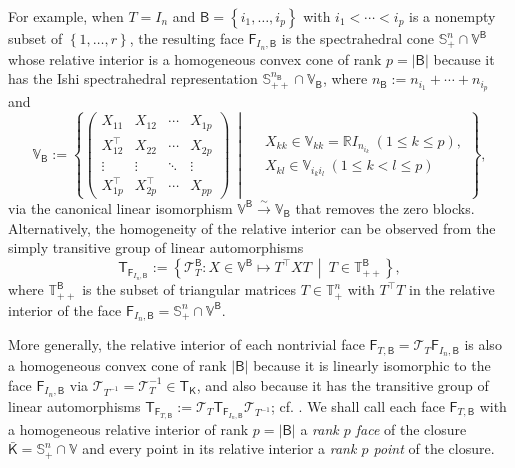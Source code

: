 \documentclass[oneside]{amsart}
\theoremstyle{plain}
\theoremstyle{definition}
\theoremstyle{remark}
\numberwithin{equation}{section}
\begin{document}
For example, when $T =  I_{n}$ and $\mathsf{B} = \left\{i_{1}, \dotsc,
i_{p}\right\}$ with $i_{1} < \dotsb < i_{p}$ is a nonempty subset of
$\left\{1, \dotsc, r\right\}$, the resulting face
$\mathsf{F}_{I_{n},\mathsf{B}}$ is the spectrahedral cone
$\mathbb{S}^{n}_{+} \cap \mathbb{V}^{\mathsf{B}}$ whose relative interior
is a homogeneous convex cone of rank $p = \lvert \mathsf{B} \rvert$ because
it has the Ishi spectrahedral representation
$\mathbb{S}^{n_{\mathsf{B}}}_{++} \cap \mathbb{V}_{\mathsf{B}}$, where
$n_{\mathsf{B}} := n_{i_{1}} + \dotsb + n_{i_{p}}$ and
\[
\mathbb{V}_{\mathsf{B}} := \left\{
\begin{pmatrix}
X_{11} & X_{12} & \cdots & X_{1p}
\\
X_{12}^{\top} & X_{22} & \cdots & X_{2p}
\\
\vdots & \vdots & \ddots & \vdots
\\
X_{1p}^{\top} & X_{2p}^{\top} & \cdots & X_{pp}
\end{pmatrix}
\ \middle|\
\begin{aligned}
& X_{kk} \in \mathbb{V}_{kk} = \mathbb{R} I_{n_{i_{k}}} \ (1 \leq k \leq
p),
\\
& X_{kl} \in \mathbb{V}_{i_{k} i_{l}} \ (1 \leq k < l \leq p)
\end{aligned}
\right\},
\]
via the canonical linear isomorphism $\mathbb{V}^{\mathsf{B}}
\xrightarrow{\sim} \mathbb{V}_{\mathsf{B}}$ that removes the zero blocks.
Alternatively, the homogeneity of the relative interior can be observed
from the simply transitive group of linear automorphisms
\[
\mathsf{T}_{\mathsf{F}_{I_{n},\mathsf{B}}} :=
\left\{\mathcal{T}_{T}^{\mathsf{B}} : X \in \mathbb{V}^{\mathsf{B}} \mapsto
T^{\top} X T\ \middle|\ T \in \mathbb{T}_{++}^{\mathsf{B}}\right\},
\]
where $\mathbb{T}_{++}^{\mathsf{B}}$ is the subset of triangular matrices
$T \in \mathbb{T}^{n}_{+}$ with $T^{\top} T$ in the relative interior of
the face $\mathsf{F}_{I_{n},\mathsf{B}} = \mathbb{S}^{n}_{+} \cap
\mathbb{V}^{\mathsf{B}}$.

More generally, the relative interior of each nontrivial face
$\mathsf{F}_{T,\mathsf{B}} = \mathcal{T}_{T} \mathsf{F}_{I_{n},\mathsf{B}}$
is also a homogeneous convex cone of rank $\lvert \mathsf{B} \rvert$
because it is linearly isomorphic to the face
$\mathsf{F}_{I_{n},\mathsf{B}}$ via $\mathcal{T}_{T^{-1}} =
\mathcal{T}_{T}^{-1} \in \mathsf{T}_{\mathsf{K}}$, and also because it has
the transitive group of linear automorphisms
$\mathsf{T}_{\mathsf{F}_{T,\mathsf{B}}} := \mathcal{T}_{T}
\mathsf{T}_{\mathsf{F}_{I_{n},\mathsf{B}}} \mathcal{T}_{T^{-1}}$; cf.\@
\cite[Theorem~3.6]{GouItoLou25}. We shall call each face
$\mathsf{F}_{T,\mathsf{B}}$ with a homogeneous relative interior of rank $p
= \lvert \mathsf{B} \rvert$ a \emph{rank $p$ face} of the closure
$\bar{\mathsf{K}} = \mathbb{S}^{n}_{+} \cap \mathbb{V}$ and every point in
its relative interior a \emph{rank $p$ point} of the closure.
\end{document}
